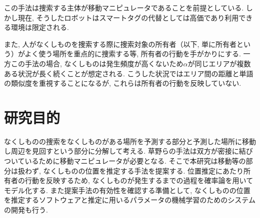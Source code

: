 この手法は捜索する主体が移動マニピュレータであることを前提としている. 
しかし現在, そうしたロボットはスマートタグの代替としては高価であり利用できる環境は限定される. 

また, 人がなくしものを捜索する際に捜索対象の所有者（以下, 単に所有者という）がよく使う場所を重点的に捜索する等, 所有者の行動を手がかりにする. 
一方この手法の場合, なくしものは発生頻度が高くないため$\alpha$が同じエリアが複数ある状況が長く続くことが想定される. 
こうした状況ではエリア間の距離と単語の類似度を重視することになるが, これらは所有者の行動を反映していない. 

\section{研究目的}
なくしものの捜索をなくしものがある場所を予測する部分と予測した場所に移動し周辺を見回すという部分に分解して考える. 
草野らの手法は双方が密接に結びついているために移動マニピュレータが必要となる. 
そこで本研究は移動等の部分は扱わず, なくしものの位置を推定する手法を提案する. 
位置推定にあたり所有者の行動を反映するため, なくしものが発生するまでの過程を確率論を用いてモデル化する. 
また提案手法の有効性を確認する準備として, なくしものの位置を推定するソフトウェアと推定に用いるパラメータの機械学習のためのシステムの開発も行う. 
